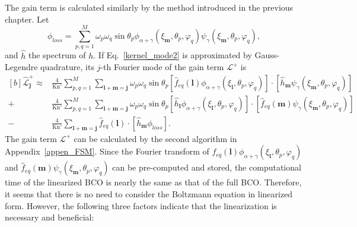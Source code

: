 The gain term is calculated similarly by the method introduced in the previous chapter. Let
\begin{equation}
\phi_{loss}=\sum_{p,q=1}^{M}\omega_p\omega_q\sin\theta_p\phi_{\alpha+\gamma}(\xi_{\bm{m}},\theta_p,\varphi_q)    \psi_{\gamma}(\xi_{\bm{m}},\theta_p,\varphi_q),
\end{equation}
and $\hat{h}$  the spectrum of $h$. If Eq.~\eqref{kernel_mode2} is approximated by Gauss-Legendre quadrature, its $j$-th Fourier mode of the gain term $\mathcal{L}^+$ is 
\begin{equation}\label{detailed_linear}
\begin{aligned}[b]
\widehat{\mathcal{L}}^+_{\bm{j}}\approx &\frac{4}{\text{Kn}'}\sum_{p,q=1}^{M} \sum_{\bm{l}+\bm{m}=\bm{j}}\omega_p\omega_q\sin\theta_p[\hat{f}_{eq}(\bm{l}){\phi_{\alpha+\gamma}(\xi_{\bm{l}},\theta_p,\varphi_q)}]\cdot[\hat{h}_{\bm{m}}{\psi_{\gamma}(\xi_{\bm{m}},\theta_p,\varphi_q)}]\\
+&\frac{4}{\text{Kn}'}\sum_{p,q=1}^{M} \sum_{\bm{l}+\bm{m}=\bm{j}}\omega_p\omega_q\sin\theta_p[\hat{h}_{\bm{l}}{\phi_{\alpha+\gamma}(\xi_{\bm{l}},\theta_p,\varphi_q)}]\cdot[\hat{f}_{eq}(\bm{m}){\psi_{\gamma}(\xi_{\bm{m}},\theta_p,\varphi_q)}]
\\
-&\frac{4}{\text{Kn}'}\sum_{\bm{l}+\bm{m}=\bm{j}}\hat{f}_{eq}(\bm{l})\cdot[\hat{h}_{\bm{m}}{\phi_{loss}}].
\end{aligned}
\end{equation}
The gain term $\mathcal{L}^+$ can be calculated by the second algorithm in Appendix~\ref{appen_FSM}. Since the Fourier transform of  $\hat{f}_{eq}(\bm{l}){\phi_{\alpha+\gamma}(\xi_{\bm{l}},\theta_p,\varphi_q)}$ and $\hat{f}_{eq}(\bm{m}){\psi_{\gamma}(\xi_{\bm{m}},\theta_p,\varphi_q)}$ can be pre-computed and stored, the computational time of the linearized BCO is nearly the same as that of the full BCO. Therefore, it seems that there is no need to consider the Boltzmann equation in linearized form. However, the following three factors indicate that the linearization is necessary and beneficial: 
